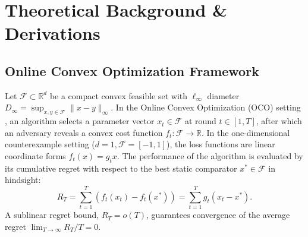 \section{Theoretical Background \& Derivations}
\label{sec:theory}

\subsection{Online Convex Optimization Framework}
Let $\mathcal{F} \subset \mathbb{R}^d$ be a compact convex feasible set with $\ell_\infty$ diameter $D_\infty = \sup_{x, y \in \mathcal{F}} \|x - y\|_\infty$. In the Online Convex Optimization (OCO) setting \citep{hazan2016introduction}, an algorithm selects a parameter vector $x_t \in \mathcal{F}$ at round $t \in [1, T]$, after which an adversary reveals a convex cost function $f_t: \mathcal{F} \to \mathbb{R}$. In the one-dimensional counterexample setting ($d=1, \mathcal{F} = [-1, 1]$), the loss functions are linear coordinate forms $f_t(x) = g_t x$. The performance of the algorithm is evaluated by its cumulative regret with respect to the best static comparator $x^* \in \mathcal{F}$ in hindsight:
\begin{equation}
    R_T = \sum_{t=1}^T \left(f_t(x_t) - f_t(x^*)\right) = \sum_{t=1}^T g_t (x_t - x^*).
    \label{eq:regret_def}
\end{equation}
A sublinear regret bound, $R_T = o(T)$, guarantees convergence of the average regret $\lim_{T \to \infty} R_T / T = 0$.

